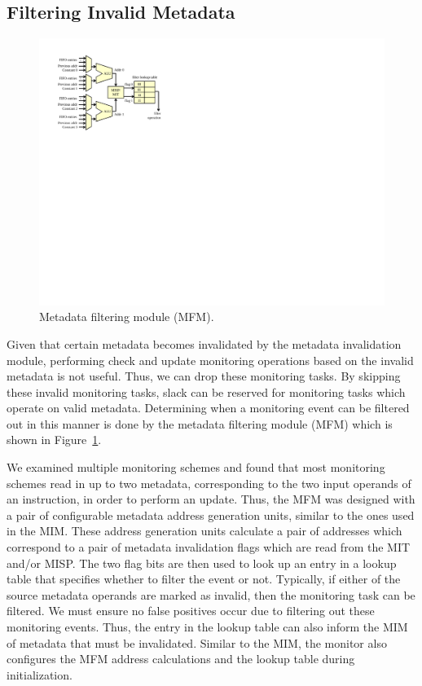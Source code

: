 \subsection{Filtering Invalid Metadata}
\label{sec:hwdrop.filter}

\begin{figure}
  \begin{center}
    \includegraphics[width=\columnwidth]{monitoring_hard_drop/figs/mfm.pdf}
    \caption{Metadata filtering module (MFM).}
    \label{fig:hwdrop.mfm}
  \end{center}
\end{figure}

Given that certain metadata becomes invalidated by the metadata invalidation
module, performing check and update monitoring operations based on the invalid
metadata is not useful. Thus, we can drop these monitoring tasks. By skipping
these invalid monitoring tasks, slack can be reserved for monitoring tasks
which operate on valid metadata. Determining when a monitoring event can be
filtered out in this manner is done by the metadata filtering module (MFM)
which is shown in Figure~\ref{fig:hwdrop.mfm}.

We examined multiple monitoring schemes and found that most monitoring schemes
read in up to two metadata, corresponding to the two input operands of an
instruction, in order to perform an update.  Thus, the MFM was designed with a
pair of configurable metadata address generation units, similar to the ones
used in the MIM. These address generation units calculate a pair of addresses
which correspond to a pair of metadata invalidation flags which are read from
the MIT and/or MISP. The two flag bits are then used to look up an entry in a
lookup table that specifies whether to filter the event or not. Typically, if
either of the source metadata operands are marked as invalid, then the
monitoring task can be filtered. We must ensure no false positives occur due
to filtering out these monitoring events. Thus, the entry in the lookup table
can also inform the MIM of metadata that must be invalidated.  Similar to the
MIM, the monitor also configures the MFM address calculations and the lookup
table during initialization.

